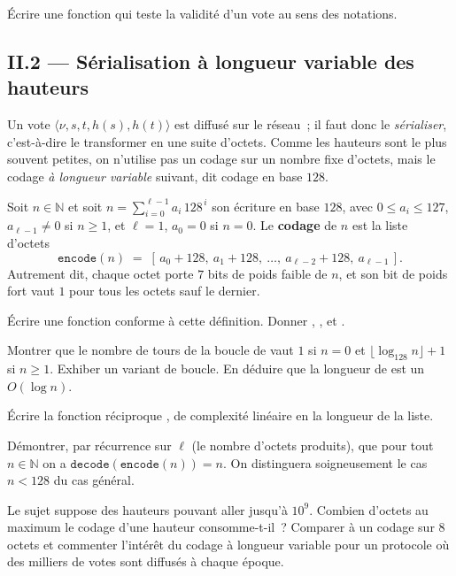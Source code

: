 \documentclass[11pt,a4paper]{article}
\begin{document}
\Q Écrire une fonction  qui teste la validité d'un
vote  au sens des notations.

\subsection*{II.2 --- Sérialisation à longueur variable des hauteurs}

Un vote $\langle \nu, s, t, h(s), h(t)\rangle$ est diffusé sur le réseau~; il faut donc le
\emph{sérialiser}, c'est-à-dire le transformer en une suite d'octets. Comme les hauteurs
sont le plus souvent petites, on n'utilise pas un codage sur un nombre fixe d'octets, mais
le codage \emph{à longueur variable} suivant, dit codage en base $128$.

\begin{defi}
Soit $n\in\mathbb{N}$ et soit $n=\sum_{i=0}^{\ell-1} a_i\,128^{\,i}$ son écriture en base
$128$, avec $0\le a_i\le 127$, $a_{\ell-1}\ne 0$ si $n\ge 1$, et $\ell=1$, $a_0=0$ si
$n=0$. Le \textbf{codage} de $n$ est la liste d'octets
\[ \texttt{encode}(n) \;=\; [\,a_0+128,\ a_1+128,\ \dots,\ a_{\ell-2}+128,\ a_{\ell-1}\,]. \]
Autrement dit, chaque octet porte $7$ bits de poids faible de $n$, et son bit de poids fort
vaut $1$ pour tous les octets sauf le dernier.
\end{defi}

\Q Écrire une fonction  conforme à cette définition. Donner
, ,  et .

\Q Montrer que le nombre de tours de la boucle de  vaut $1$ si $n=0$ et
$\lfloor \log_{128} n\rfloor + 1$ si $n\ge 1$. Exhiber un variant de boucle. En déduire que
la longueur de  est un $O(\log n)$.

\Q Écrire la fonction réciproque , de complexité linéaire en la
longueur de la liste.

\Q Démontrer, par récurrence sur $\ell$ (le nombre d'octets produits), que pour tout
$n\in\mathbb{N}$ on a $\texttt{decode}(\texttt{encode}(n)) = n$. On distinguera soigneusement le
cas $n<128$ du cas général.

\Q Le sujet suppose des hauteurs pouvant aller jusqu'à $10^{9}$. Combien d'octets au
maximum le codage d'une hauteur consomme-t-il~? Comparer à un codage sur $8$ octets et
commenter l'intérêt du codage à longueur variable pour un protocole où des milliers de votes
sont diffusés à chaque époque.
\end{document}
